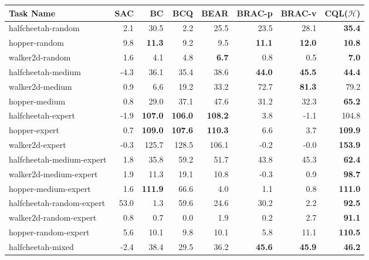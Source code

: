 \begin{table*}[h]
\centering
\fontsize{8}{8}\selectfont

\begin{tabular}{l|r|r|r|r|r|r||r}
\hline
\textbf{Task Name} & \textbf{SAC} & \textbf{BC} & \textbf{BCQ} & \textbf{BEAR} & \textbf{BRAC-p} & \textbf{BRAC-v} & \textbf{CQL($\mathcal{H}$)}\\ \hline
halfcheetah-random &  2.1 & 30.5 & 2.2 & 25.5 & 23.5 & 28.1 & \textbf{35.4} \\
hopper-random & 9.8 & \textbf{11.3} & 9.2 & 9.5 & \textbf{11.1} & \textbf{12.0} & \textbf{10.8}\\
walker2d-random & 1.6 & 4.1 & 4.8 &  \textbf{6.7} & 0.8 & 0.5 & \textbf{7.0}\\ \hline
halfcheetah-medium & -4.3 & 36.1 & 35.4 & 38.6 & \textbf{44.0} & \textbf{45.5} & \textbf{44.4}\\
walker2d-medium & 0.9 & 6.6 & 19.2 & 33.2 & 72.7 & \textbf{81.3} & {79.2}\\
hopper-medium & 0.8 & 29.0 & 37.1 & 47.6 & 31.2 & 32.3 & \textbf{65.2}\\ \hline
halfcheetah-expert & -1.9 & \textbf{107.0} & \textbf{106.0} & \textbf{108.2} & 3.8 & -1.1 & {104.8}\\
hopper-expert & 0.7 & \textbf{109.0} & \textbf{107.6} & \textbf{110.3} & 6.6 & 3.7 & \textbf{109.9} \\
walker2d-expert & -0.3 & 125.7 & 128.5 & 106.1 & -0.2 & -0.0 & \textbf{153.9} \\ \hline
halfcheetah-medium-expert & 1.8 & 35.8 & 59.2 & 51.7 & 43.8 & 45.3 & \textbf{62.4}\\
walker2d-medium-expert & 1.9 & 11.3 & 19.1 & 10.8 & -0.3 & 0.9 & \textbf{98.7}\\
hopper-medium-expert & 1.6 & \textbf{111.9} & 66.6 & 4.0 & 1.1 & 0.8 & \textbf{111.0}\\ \hline
halfcheetah-random-expert & 53.0 & 1.3 & 59.6 & 24.6 & 30.2 & 2.2 & \textbf{92.5}\\
walker2d-random-expert & 0.8 & 0.7 & 0.0 & 1.9 & 0.2 & 2.7 & \textbf{91.1}\\
hopper-random-expert & 5.6 & 10.1 & 9.8 & 10.1 & 5.8 & 11.1 & \textbf{110.5} \\ \hline
halfcheetah-mixed & -2.4 & 38.4 & 29.5 & 36.2 & \textbf{45.6} & \textbf{45.9} & \textbf{46.2}\\

\end{tabular}
\end{table*}
